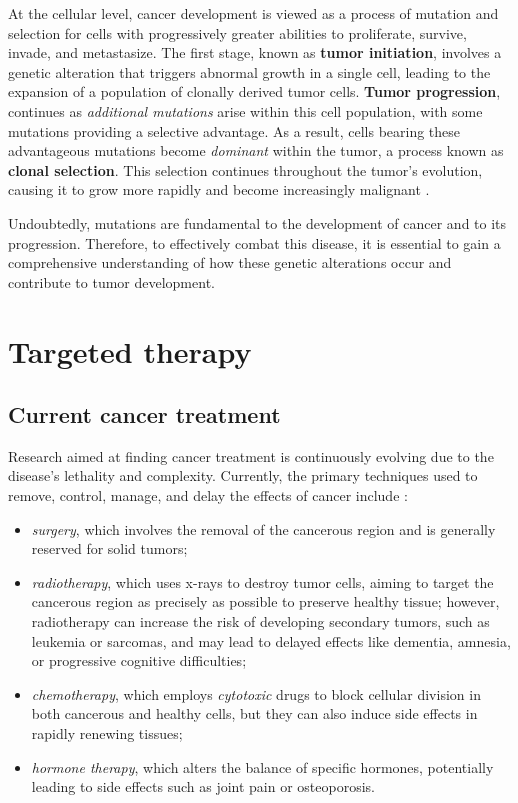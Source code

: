 At the cellular level, cancer development is viewed as a process of mutation and selection for cells with progressively greater abilities to proliferate, survive, invade, and metastasize. The first stage, known as \textbf{tumor initiation}, involves a genetic alteration that triggers abnormal growth in a single cell, leading to the expansion of a population of clonally derived tumor cells. \textbf{Tumor progression}, continues as \textit{additional mutations} arise within this cell population, with some mutations providing a selective advantage. As a result, cells bearing these advantageous mutations become \textit{dominant} within the tumor, a process known as \textbf{clonal selection}. This selection continues throughout the tumor's evolution, causing it to grow more rapidly and become increasingly malignant \cite{nih_cancer_dev}.

Undoubtedly, mutations are fundamental to the development of cancer and to its progression. Therefore, to effectively combat this disease, it is essential to gain a comprehensive understanding of how these genetic alterations occur and contribute to tumor development.

\section{Targeted therapy}

\subsection{Current cancer treatment}

Research aimed at finding cancer treatment is continuously evolving due to the disease's lethality and complexity. Currently, the primary techniques used to remove, control, manage, and delay the effects of cancer include \cite{cancer_treat}:

\begin{itemize}
    \item \textit{surgery}, which involves the removal of the cancerous region and is generally reserved for solid tumors;
    \item \textit{radiotherapy}, which uses x-rays to destroy tumor cells, aiming to target the cancerous region as precisely as possible to preserve healthy tissue; however, radiotherapy can increase the risk of developing secondary tumors, such as leukemia or sarcomas, and may lead to delayed effects like dementia, amnesia, or progressive cognitive difficulties;
    \item \textit{chemotherapy}, which employs \textit{cytotoxic} drugs to block cellular division in both cancerous and healthy cells, but they can also induce side effects in rapidly renewing tissues;
    \item \textit{hormone therapy}, which alters the balance of specific hormones, potentially leading to side effects such as joint pain or osteoporosis.
\end{itemize}

